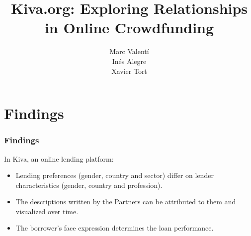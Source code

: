 \documentclass{beamer}
\date{}
\begin{document}
\title{Kiva.org: Exploring Relationships in Online Crowdfunding}
\author{Marc Valentí \\ Inés Alegre \\ Xavier Tort}


\begin{frame}
\titlepage

\end{frame}

\section{Findings} 
\begin{frame}\frametitle{Findings}
In Kiva, an online lending platform:
\begin{itemize}
\item Lending preferences (gender, country and sector) differ on lender characteristics (gender, country and profession).
\item The descriptions written by the Partners can be attributed to them and visualized over time.
\item The borrower's face expression determines the loan performance.
\end{itemize}
\end{frame}



\end{document}
